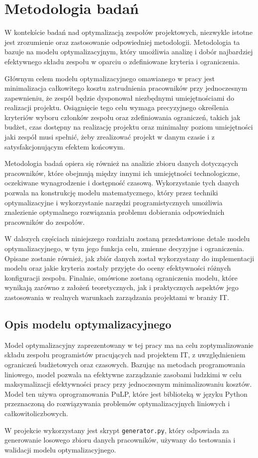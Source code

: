 \chapter{Metodologia badań}
\par W kontekście badań nad optymalizacją zespołów projektowych, niezwykle istotne jest zrozumienie oraz zastosowanie odpowiedniej metodologii. Metodologia ta bazuje na modelu optymalizacyjnym, który umożliwia analizę i dobór najbardziej efektywnego składu zespołu w oparciu o zdefiniowane kryteria i ograniczenia. 
\par Głównym celem modelu optymalizacyjnego omawianego w pracy jest minimalizacja całkowitego kosztu zatrudnienia pracowników przy jednoczesnym zapewnieniu, że zespół będzie dysponował niezbędnymi umiejętnościami do realizacji projektu. Osiągnięcie tego celu wymaga precyzyjnego określenia kryteriów wyboru członków zespołu oraz zdefiniowania ograniczeń, takich jak budżet, czas dostępny na realizację projektu oraz minimalny poziom umiejętności jaki zespół musi spełnić, żeby zrealizować projekt w danym czasie i z satysfakcjonującym efektem końcowym.
\par Metodologia badań opiera się również na analizie zbioru danych dotyczących pracowników, które obejmują między innymi ich umiejętności technologiczne, oczekiwane wynagrodzenie i dostępność czasową. Wykorzystanie tych danych pozwala na konstrukcję modelu matematycznego, który przez techniki optymalizacyjne i wykorzystanie narzędzi programistycznych umożliwia znalezienie optymalnego rozwiązania problemu dobierania odpowiednich pracowników do zespołów.
\par W dalszych częściach niniejszego rozdziału zostaną przedstawione detale modelu optymalizacyjnego, w tym jego funkcja celu, zmienne decyzyjne i ograniczenia. Opisane zostanie również, jak zbiór danych został wykorzystany do implementacji modelu oraz jakie kryteria zostały przyjęte do oceny efektywności różnych konfiguracji zespołu. Finalnie, omówione zostaną ograniczenia modelu, które wynikają zarówno z założeń teoretycznych, jak i praktycznych aspektów jego zastosowania w realnych warunkach zarządzania projektami w branży IT.


\section{Opis modelu optymalizacyjnego}
\par Model optymalizacyjny zaprezentowany w tej pracy ma na celu zoptymalizowanie składu zespołu programistów pracujących nad projektem IT, z uwzględnieniem ograniczeń budżetowych oraz czasowych. Bazując na metodach programowania liniowego, model pozwala na efektywne zarządzanie zasobami ludzkimi w celu maksymalizacji efektywności pracy przy jednoczesnym minimalizowaniu kosztów. Model ten używa oprogramowania PuLP, które jest biblioteką w języku Python przeznaczoną do rozwiązywania problemów optymalizacyjnych liniowych i całkowitoliczbowych.
\par W projekcie wykorzystany jest skrypt \verb|generator.py|, który odpowiada za generowanie losowego zbioru danych pracowników, używany do testowania i walidacji modelu optymalizacyjnego. 

